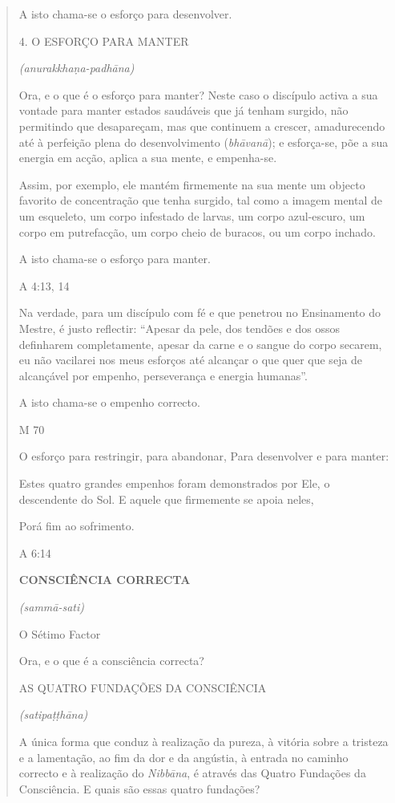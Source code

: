 \begin{quote}
A isto chama-se o esforço para desenvolver.

4. O ESFORÇO PARA MANTER

\emph{(anurakkhaṇa-padhāna)}

Ora, e o que é o esforço para manter? Neste caso o discípulo activa a sua vontade para manter estados saudáveis que já tenham surgido, não permitindo que desapareçam, mas que continuem a crescer, amadurecendo até à perfeição plena do desenvolvimento (\emph{bhāvanā}); e esforça-se, põe a sua energia em acção, aplica a sua mente, e empenha-se.

Assim, por exemplo, ele mantém firmemente na sua mente um objecto favorito de concentração que tenha surgido, tal como a imagem mental de um esqueleto, um corpo infestado de larvas, um corpo azul-escuro, um corpo em putrefacção, um corpo cheio de buracos, ou um corpo inchado.

A isto chama-se o esforço para manter.

A 4:13, 14

Na verdade, para um discípulo com fé e que penetrou no Ensinamento do Mestre, é justo reflectir: ``Apesar da pele, dos tendões e dos ossos definharem completamente, apesar da carne e o sangue do corpo secarem, eu não vacilarei nos meus esforços até alcançar o que quer que seja de alcançável por empenho, perseverança e energia humanas''.

A isto chama-se o empenho correcto.

M 70

O esforço para restringir, para abandonar, Para desenvolver e para manter:

Estes quatro grandes empenhos foram demonstrados por Ele, o descendente do Sol. E aquele que firmemente se apoia neles,

Porá fim ao sofrimento.

A 6:14

\textbf{CONSCIÊNCIA CORRECTA}

\emph{(sammā-sati)}

O Sétimo Factor

Ora, e o que é a consciência correcta?

AS QUATRO FUNDAÇÕES DA CONSCIÊNCIA

\emph{(satipaṭṭhāna)}

A única forma que conduz à realização da pureza, à vitória sobre a tristeza e a lamentação, ao fim da dor e da angústia, à entrada no caminho correcto e à realização do \emph{Nibbāna}, é através das Quatro Fundações da Consciência. E quais são essas quatro fundações?


\end{quote}
